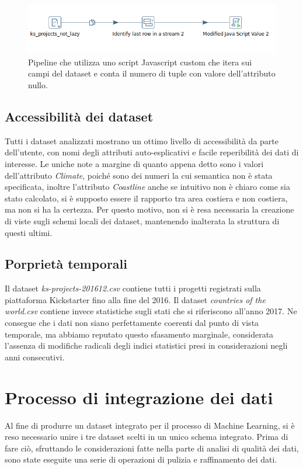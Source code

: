 \begin{figure}[h!]
	\centering
	\includegraphics[width=0.7\linewidth]{images/DQ_completezza}
	\caption{Pipeline che utilizza uno script Javascript custom che itera sui campi del dataset e conta il numero di tuple con valore dell'attributo nullo.}
	\label{fig:dqcompletezza}
\end{figure}


\subsection{Accessibilità dei dataset}
Tutti i dataset analizzati mostrano un ottimo livello di accessibilità da parte dell'utente, con nomi degli attributi auto-esplicativi e facile reperibilità dei dati di interesse. 
Le uniche note a margine di quanto appena detto sono i valori dell'attributo \textit{Climate}, poiché sono dei numeri la cui semantica non è stata specificata, inoltre l'attributo \textit{Coastline} anche se intuitivo non è chiaro come sia stato calcolato, si è supposto essere il rapporto tra area costiera e non costiera, ma non si ha la certezza.
Per questo motivo, non si è resa necessaria la creazione di viste sugli schemi locali dei dataset, mantenendo inalterata la struttura di questi ultimi.

\subsection{Porprietà temporali}
\label{subsec:temporali}
Il dataset \textit{ks-projects-201612.csv} contiene tutti i progetti registrati sulla piattaforma Kickstarter fino alla fine del 2016. Il dataset \textit{countries of the world.csv} contiene invece statistiche sugli stati che si riferiscono all'anno 2017. Ne consegue che i dati non siano perfettamente coerenti dal punto di vista temporale, ma abbiamo reputato questo sfasamento marginale, considerata l'assenza di modifiche radicali degli indici statistici presi in considerazioni negli anni consecutivi.

\section{Processo di integrazione dei dati}
Al fine di produrre un dataset integrato per il processo di Machine Learning, si è reso necessario unire i tre dataset scelti in un unico schema integrato. Prima di fare ciò, sfruttando le considerazioni fatte nella parte di analisi di qualità dei dati, sono state eseguite una serie di operazioni di pulizia e raffinamento dei dati.\\

